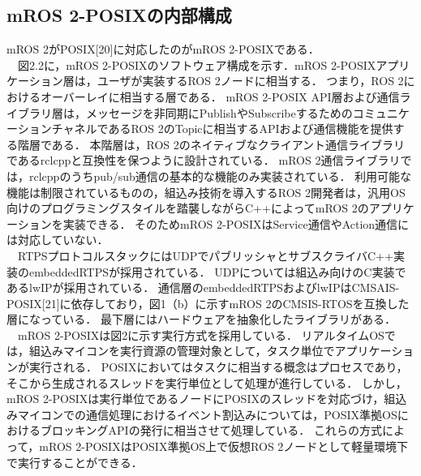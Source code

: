\subsection{mROS 2-POSIXの内部構成}
mROS 2がPOSIX[20]に対応したのがmROS 2-POSIXである．
\\　図2.2に，mROS 2-POSIXのソフトウェア構成を示す．mROS 2-POSIXアプリケーション層は，ユーザが実装するROS 2ノードに相当する．
つまり，ROS 2におけるオーバーレイに相当する層である．
mROS 2-POSIX API層および通信ライブラリ層は，メッセージを非同期にPublishやSubscribeするためのコミュニケーションチャネルであるROS 2のTopicに相当するAPIおよび通信機能を提供する階層である．
本階層は，ROS 2のネイティブなクライアント通信ライブラリであるrclcppと互換性を保つように設計されている．
mROS 2通信ライブラリでは，rclcppのうちpub/sub通信の基本的な機能のみ実装されている．
利用可能な機能は制限されているものの，組込み技術を導入するROS 2開発者は，汎用OS向けのプログラミングスタイルを踏襲しながらC++によってmROS 2のアプリケーションを実装できる．
そのためmROS 2-POSIXはService通信やAction通信には対応していない．
\\　RTPSプロトコルスタックにはUDPでパブリッシャとサブスクライバC++実装のembeddedRTPSが採用されている．
UDPについては組込み向けのC実装であるlwIPが採用されている．
通信層のembeddedRTPSおよびlwIPはCMSAIS-POSIX[21]に依存しており，図1（b）に示すmROS 2のCMSIS-RTOSを互換した層になっている．
最下層にはハードウェアを抽象化したライブラリがある．
\\　mROS 2-POSIXは図2に示す実行方式を採用している．
リアルタイムOSでは，組込みマイコンを実行資源の管理対象として，タスク単位でアプリケーションが実行される．
POSIXにおいてはタスクに相当する概念はプロセスであり，そこから生成されるスレッドを実行単位として処理が進行している．
しかし，mROS 2-POSIXは実行単位であるノードにPOSIXのスレッドを対応づけ，組込みマイコンでの通信処理におけるイベント割込みについては，POSIX準拠OSにおけるブロッキングAPIの発行に相当させて処理している．
これらの方式によって，mROS 2-POSIXはPOSIX準拠OS上で仮想ROS 2ノードとして軽量環境下で実行することができる．

